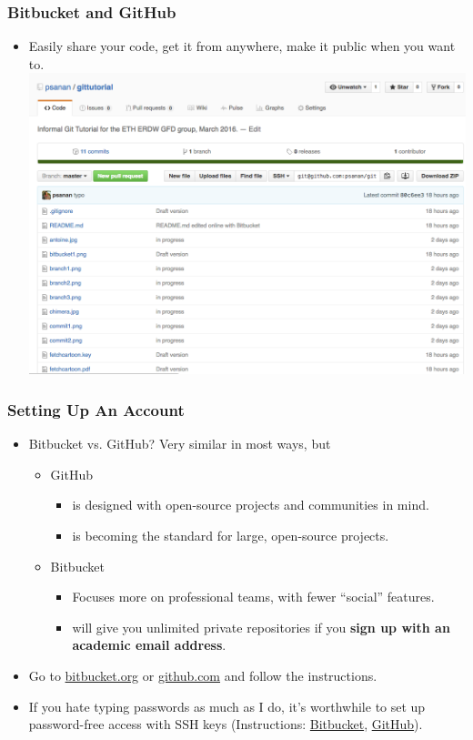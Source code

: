 \documentclass{beamer}
\begin{document}
\begin{frame}[fragile]
\frametitle{Bitbucket and GitHub}
\begin{itemize}
\item Easily share your code, get it from anywhere, make it public when you want to. \\
\includegraphics[scale=0.3]{github1}
\end{itemize}
\end{frame}

\begin{frame}[fragile]
\frametitle{Setting Up An Account}
\begin{itemize}
\item Bitbucket vs. GitHub? Very similar in most ways, but
\begin{itemize}
\item
GitHub
\begin{itemize}
\item is designed with open-source projects and communities in mind.
\item is becoming the standard for large, open-source projects.
\end{itemize}
\item Bitbucket
\begin{itemize}
\item Focuses more on professional teams, with fewer ``social'' features.
\item will give you unlimited private repositories if you \textbf{sign up with an academic email address}.
\end{itemize}
\end{itemize}
\item Go to \href{https://bitbucket.org}{bitbucket.org} or \href{https://github.com}{github.com} and follow the instructions.
\item If you hate typing passwords as much as I do, it's worthwhile to set up password-free access with SSH keys (Instructions:
\href{https://confluence.atlassian.com/bitbucket/set-up-ssh-for-git-728138079.html}{Bitbucket},
    \href{https://help.github.com/articles/adding-a-new-ssh-key-to-your-github-account/}{GitHub}).
\end{itemize}
\end{frame}
\end{document}
